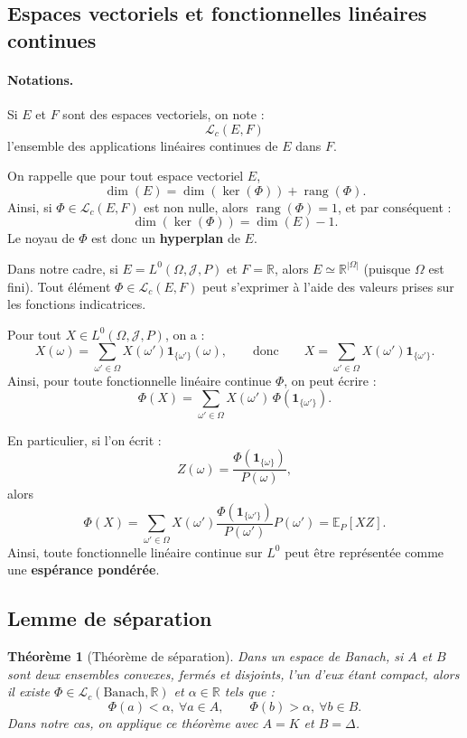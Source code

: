 \documentclass[12pt,a4paper]{article}
\numberwithin{equation}{section}
\theoremstyle{plain} %
\newtheorem{theoreme}{Théorème}              %
\theoremstyle{definition} %
\theoremstyle{remark} %
\theoremstyle{myexample}
\theoremstyle{definition}
\begin{document}
\subsection{Espaces vectoriels et fonctionnelles linéaires continues}

\paragraph{Notations.}
Si $E$ et $F$ sont des espaces vectoriels, on note :
\[
\mathcal{L}_c(E,F)
\]
l’ensemble des applications linéaires continues de $E$ dans $F$.

\medskip
\noindent
On rappelle que pour tout espace vectoriel $E$, 
\[
\dim(E) = \dim(\ker(\Phi)) + \operatorname{rang}(\Phi).
\]
Ainsi, si $\Phi \in \mathcal{L}_c(E,F)$ est non nulle, alors $\operatorname{rang}(\Phi)=1$, et par conséquent :
\[
\dim(\ker(\Phi)) = \dim(E) - 1.
\]
Le noyau de $\Phi$ est donc un \textbf{hyperplan} de $E$.

\medskip
\noindent
Dans notre cadre, si $E = L^0(\Omega, \mathcal{J}, P)$ et $F = \mathbb{R}$, alors $E \simeq \mathbb{R}^{|\Omega|}$ (puisque $\Omega$ est fini).  
Tout élément $\Phi \in \mathcal{L}_c(E,F)$ peut s’exprimer à l’aide des valeurs prises sur les fonctions indicatrices.

Pour tout $X \in L^0(\Omega, \mathcal{J}, P)$, on a :
\[
X(\omega) = \sum_{\omega' \in \Omega} X(\omega') \mathbf{1}_{\{\omega'\}}(\omega),
\qquad \text{donc} \qquad
X = \sum_{\omega' \in \Omega} X(\omega') \mathbf{1}_{\{\omega'\}}.
\]
Ainsi, pour toute fonctionnelle linéaire continue $\Phi$, on peut écrire :
\[
\Phi(X) = \sum_{\omega' \in \Omega} X(\omega') \, \Phi(\mathbf{1}_{\{\omega'\}}).
\]

En particulier, si l’on écrit :
\[
Z(\omega) = \frac{\Phi(\mathbf{1}_{\{\omega\}})}{P(\omega)},
\]
alors
\[
\Phi(X) = \sum_{\omega' \in \Omega} X(\omega') \frac{\Phi(\mathbf{1}_{\{\omega'\}})}{P(\omega')} P(\omega')
= \mathbb{E}_P[X Z].
\]
Ainsi, toute fonctionnelle linéaire continue sur $L^0$ peut être représentée comme une \textbf{espérance pondérée}.


\subsection{Lemme de séparation}

\begin{theoreme}[Théorème de séparation]
Dans un espace de Banach, si $A$ et $B$ sont deux ensembles convexes, fermés et disjoints, l’un d’eux étant compact,  
alors il existe $\Phi \in \mathcal{L}_c(\text{Banach}, \mathbb{R})$ et $\alpha \in \mathbb{R}$ tels que :
\[
\Phi(a) < \alpha,\ \forall a \in A, \qquad \Phi(b) > \alpha,\ \forall b \in B.
\]
Dans notre cas, on applique ce théorème avec $A = K$ et $B = \Delta$.
\end{theoreme}
\end{document}
